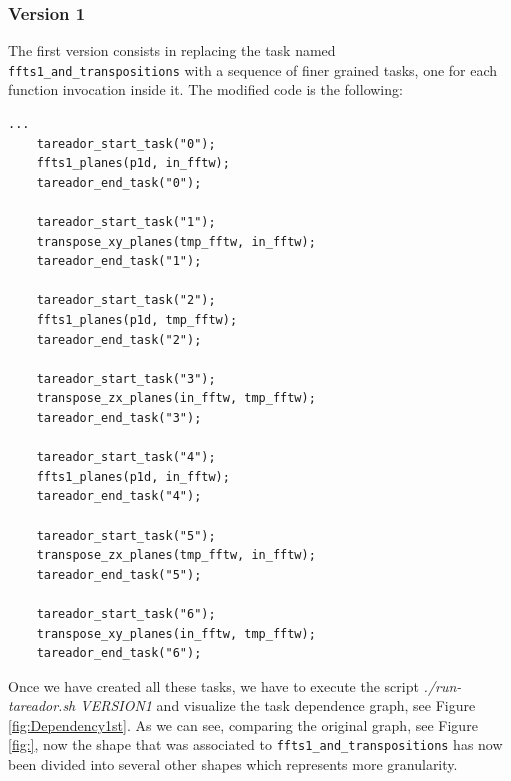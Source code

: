 \documentclass[12]{article}
\begin{document}
\subsubsection{Version 1}

The first version consists in replacing the task named \texttt{ffts1\_and\_transpositions} with a sequence of finer grained tasks, one for each function invocation inside it. The modified code is the following: 
\\
\begin{lstlisting}
...
    tareador_start_task("0");
    ffts1_planes(p1d, in_fftw);
    tareador_end_task("0");

    tareador_start_task("1");
    transpose_xy_planes(tmp_fftw, in_fftw);
    tareador_end_task("1");

    tareador_start_task("2");
    ffts1_planes(p1d, tmp_fftw);
    tareador_end_task("2");

    tareador_start_task("3");	
    transpose_zx_planes(in_fftw, tmp_fftw);
    tareador_end_task("3");
    
    tareador_start_task("4");
    ffts1_planes(p1d, in_fftw);
    tareador_end_task("4");

    tareador_start_task("5");
    transpose_zx_planes(tmp_fftw, in_fftw);
    tareador_end_task("5");

    tareador_start_task("6");
    transpose_xy_planes(in_fftw, tmp_fftw);
    tareador_end_task("6");
\end{lstlisting}

Once we have created all these tasks, we have to execute the script \textit{./run-tareador.sh VERSION1} and visualize the task dependence graph, see Figure \ref{fig:Dependency1st}. As we can see, comparing the original graph, see Figure \ref{fig:}, now the shape that was associated to \texttt{ffts1\_and\_transpositions} has now been divided into several other shapes which represents more granularity. 
\end{document}
